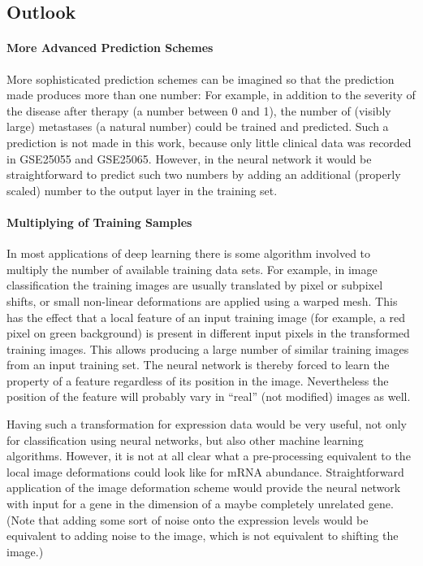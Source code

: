 \subsection{Outlook}

\paragraph{More Advanced Prediction Schemes}

More sophisticated prediction schemes can be imagined so that the
prediction made produces more than one number: For example, in addition
to the severity of the disease after therapy (a number between 0 and
1), the number of (visibly large) metastases (a natural number) could
be trained and predicted. Such a prediction is not made in this work,
because only little clinical data was recorded in GSE25055 and GSE25065.
However, in the neural network it would be straightforward to predict
such two numbers by adding an additional (properly scaled) number
to the output layer in the training set.

\paragraph{Multiplying of Training Samples}

In most applications of deep learning there is some algorithm involved
to multiply the number of available training data sets. For example,
in image classification the training images are usually translated
by pixel or subpixel shifts, or small non-linear deformations are
applied using a warped mesh. This has the effect that a local feature
of an input training image (for example, a red pixel on green background)
is present in different input pixels in the transformed training images.
This allows producing a large number of similar training images from
an input training set. The neural network is thereby forced to learn
the property of a feature regardless of its position in the image.
Nevertheless the position of the feature will probably vary in ``real''
(not modified) images as well.

Having such a transformation for expression data would be very useful,
not only for classification using neural networks, but also other
machine learning algorithms. However, it is not at all clear what
a pre-processing equivalent to the local image deformations could
look like for mRNA abundance. Straightforward application of the image
deformation scheme would provide the neural network with input for
a gene in the dimension of a maybe completely unrelated gene. (Note
that adding some sort of noise onto the expression levels would be
equivalent to adding noise to the image, which is not equivalent to
shifting the image.)


